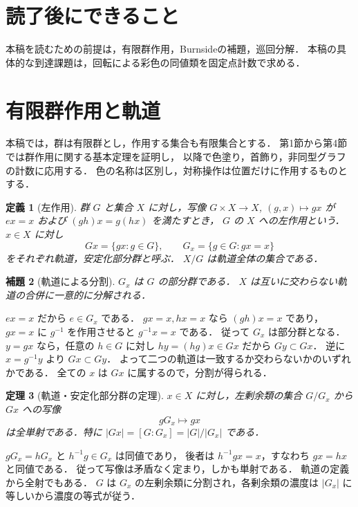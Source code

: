 \documentclass[a5paper,10pt,onecolumn]{jsarticle}
\makeatletter
\theoremstyle{mathnotetheorem}
\newtheorem{theorem}{定理}[section]
\newtheorem{definition}[theorem]{定義}
\newtheorem{lemma}[theorem]{補題}
\renewcommand{\proofname}{証明}
\renewenvironment{proof}[1][\proofname]{%
  \par\pushQED{\qed}\normalfont\topsep4\p@\@plus2\p@\relax
  \trivlist\item[\hskip\labelsep\bfseries #1]\ignorespaces
}{\popQED\endtrivlist\@endpefalse}
\makeatother
\begin{document}
\section*{読了後にできること}
本稿を読むための前提は，有限群作用，Burnsideの補題，巡回分解．
本稿の具体的な到達課題は，回転による彩色の同値類を固定点計数で求める．

\section{有限群作用と軌道}
本稿では，群は有限群とし，作用する集合も有限集合とする．
第1節から第4節では群作用に関する基本定理を証明し，
以降で色塗り，首飾り，非同型グラフの計数に応用する．
色の名称は区別し，対称操作は位置だけに作用するものとする．

\begin{definition}[左作用]
群 $G$ と集合 $X$ に対し，写像
$G\times X\to X$, $(g,x)\mapsto gx$ が
$ex=x$ および $(gh)x=g(hx)$ を満たすとき，
$G$ の $X$ への左作用という．
$x\in X$ に対し
\[
 Gx=\{gx:g\in G\},\qquad
 G_x=\{g\in G:gx=x\}
\]
をそれぞれ軌道，安定化部分群と呼ぶ．
$X/G$ は軌道全体の集合である．
\end{definition}

\begin{lemma}[軌道による分割]\label{lem:orbitpartition}
$G_x$ は $G$ の部分群である．
$X$ は互いに交わらない軌道の合併に一意的に分解される．
\end{lemma}
\begin{proof}
$ex=x$ だから $e\in G_x$ である．
$gx=x,hx=x$ なら $(gh)x=x$ であり，
$gx=x$ に $g^{-1}$ を作用させると $g^{-1}x=x$ である．
従って $G_x$ は部分群となる．
$y=gx$ なら，任意の $h\in G$ に対し
$hy=(hg)x\in Gx$ だから $Gy\subset Gx$．
逆に $x=g^{-1}y$ より $Gx\subset Gy$．
よって二つの軌道は一致するか交わらないかのいずれかである．
全ての $x$ は $Gx$ に属するので，分割が得られる．
\end{proof}

\begin{theorem}[軌道・安定化部分群の定理]\label{thm:orbitstab}
$x\in X$ に対し，左剰余類の集合 $G/G_x$ から
$Gx$ への写像
\[
  gG_x\longmapsto gx
\]
は全単射である．特に
$|Gx|=[G:G_x]=|G|/|G_x|$ である．
\end{theorem}
\begin{proof}
$gG_x=hG_x$ と $h^{-1}g\in G_x$ は同値であり，
後者は $h^{-1}gx=x$，すなわち $gx=hx$ と同値である．
従って写像は矛盾なく定まり，しかも単射である．
軌道の定義から全射でもある．
$G$ は $G_x$ の左剰余類に分割され，各剰余類の濃度は
$|G_x|$ に等しいから濃度の等式が従う．
\end{proof}
\end{document}
